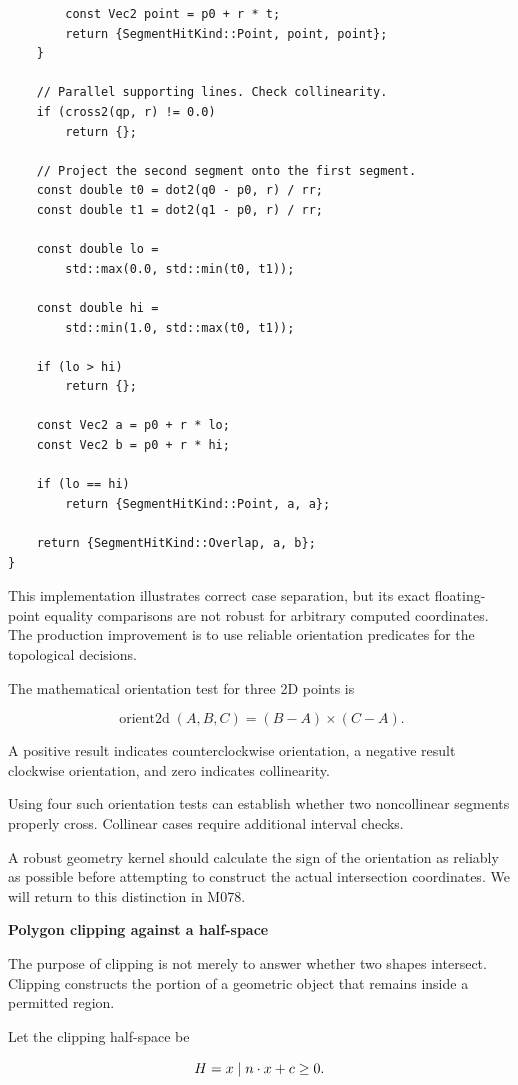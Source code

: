 \begin{verbatim}
        const Vec2 point = p0 + r * t;
        return {SegmentHitKind::Point, point, point};
    }

    // Parallel supporting lines. Check collinearity.
    if (cross2(qp, r) != 0.0)
        return {};

    // Project the second segment onto the first segment.
    const double t0 = dot2(q0 - p0, r) / rr;
    const double t1 = dot2(q1 - p0, r) / rr;

    const double lo =
        std::max(0.0, std::min(t0, t1));

    const double hi =
        std::min(1.0, std::max(t0, t1));

    if (lo > hi)
        return {};

    const Vec2 a = p0 + r * lo;
    const Vec2 b = p0 + r * hi;

    if (lo == hi)
        return {SegmentHitKind::Point, a, a};

    return {SegmentHitKind::Overlap, a, b};
}
\end{verbatim}

This implementation illustrates correct case separation, but its exact floating-point equality comparisons are not robust for arbitrary computed coordinates. The production improvement is to use reliable orientation predicates for the topological decisions.

The mathematical orientation test for three 2D points is

\[
\operatorname{orient2d}(A,B,C) = (B-A)\times(C-A).
\]

A positive result indicates counterclockwise orientation, a negative result clockwise orientation, and zero indicates collinearity.

Using four such orientation tests can establish whether two noncollinear segments properly cross. Collinear cases require additional interval checks.

A robust geometry kernel should calculate the sign of the orientation as reliably as possible before attempting to construct the actual intersection coordinates. We will return to this distinction in M078.

\textbf{Polygon clipping against a half-space}

The purpose of clipping is not merely to answer whether two shapes intersect. Clipping constructs the portion of a geometric object that remains inside a permitted region.

Let the clipping half-space be

\[
H=\\{x\mid n\cdot x+c\ge0\\}.
\]

